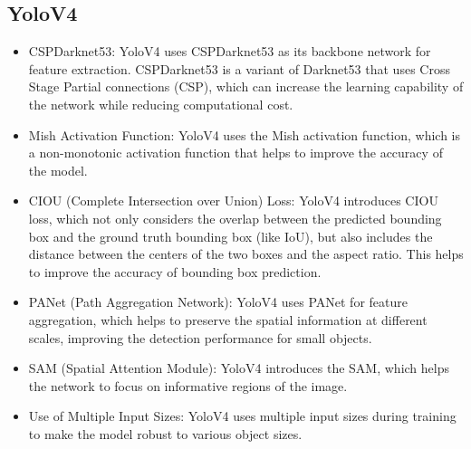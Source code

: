 \subsection{YoloV4}
\begin{itemize}
  \item CSPDarknet53: YoloV4 uses CSPDarknet53 as its backbone network for feature extraction. CSPDarknet53 is a variant of Darknet53 that uses Cross Stage Partial connections (CSP), which can increase the learning capability of the network while reducing computational cost.
  \item Mish Activation Function: YoloV4 uses the Mish activation function, which is a non-monotonic activation function that helps to improve the accuracy of the model.
  \item CIOU (Complete Intersection over Union) Loss: YoloV4 introduces CIOU loss, which not only considers the overlap between the predicted bounding box and the ground truth bounding box (like IoU), but also includes the distance between the centers of the two boxes and the aspect ratio. This helps to improve the accuracy of bounding box prediction.
  \item PANet (Path Aggregation Network): YoloV4 uses PANet for feature aggregation, which helps to preserve the spatial information at different scales, improving the detection performance for small objects.
  \item SAM (Spatial Attention Module): YoloV4 introduces the SAM, which helps the network to focus on informative regions of the image.
  \item Use of Multiple Input Sizes: YoloV4 uses multiple input sizes during training to make the model robust to various object sizes.
\end{itemize}

